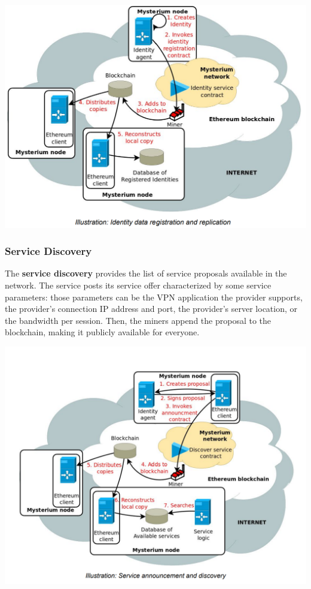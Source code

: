 \documentclass[12pt]{article}
\begin{document}
	\bigbreak
	\begin{center}
		\includegraphics[width=1\linewidth]{images/mysterium_identity_creation.png}
	\end{center}

	\subsubsection{Service Discovery}

	The \textbf{service discovery} provides the list of service proposals available in the network. The service posts its service offer characterized by some service parameters: those parameters can be the VPN application the provider supports, the provider's connection IP address and port, the provider's server location, or the bandwidth per session. Then, the miners append the proposal to the blockchain, making it publicly available for everyone.\\

	\bigbreak
	\begin{center}
		\includegraphics[width=1\linewidth]{images/mysterium_service_announcement.png}
	\end{center}
	
\end{document}
